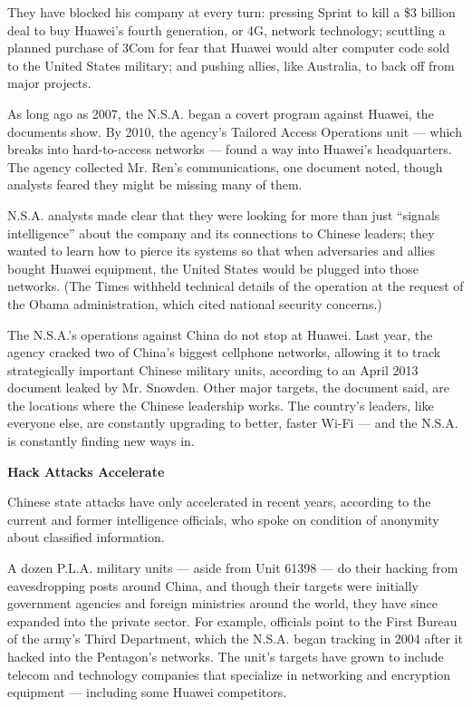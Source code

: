 They have blocked his company at every turn: pressing Sprint to kill a
\$3 billion deal to buy Huawei's fourth generation, or 4G, network
technology; scuttling a planned purchase of 3Com for fear that Huawei
would alter computer code sold to the United States military; and
pushing allies, like Australia, to back off from major projects.

As long ago as 2007, the N.S.A. began a covert program against Huawei,
the documents show. By 2010, the agency's Tailored Access Operations
unit --- which breaks into hard-to-access networks --- found a way into
Huawei's headquarters. The agency collected Mr. Ren's communications,
one document noted, though analysts feared they might be missing many of
them.

N.S.A. analysts made clear that they were looking for more than just
``signals intelligence'' about the company and its connections to
Chinese leaders; they wanted to learn how to pierce its systems so that
when adversaries and allies bought Huawei equipment, the United States
would be plugged into those networks. (The Times withheld technical
details of the operation at the request of the Obama administration,
which cited national security concerns.)

The N.S.A.'s operations against China do not stop at Huawei. Last year,
the agency cracked two of China's biggest cellphone networks, allowing
it to track strategically important Chinese military units, according to
an April 2013 document leaked by Mr. Snowden. Other major targets, the
document said, are the locations where the Chinese leadership works. The
country's leaders, like everyone else, are constantly upgrading to
better, faster Wi-Fi --- and the N.S.A. is constantly finding new ways
in.

\textbf{Hack Attacks Accelerate}

Chinese state attacks have only accelerated in recent years, according
to the current and former intelligence officials, who spoke on condition
of anonymity about classified information.

A dozen P.L.A. military units --- aside from Unit 61398 --- do their
hacking from eavesdropping posts around China, and though their targets
were initially government agencies and foreign ministries around the
world, they have since expanded into the private sector. For example,
officials point to the First Bureau of the army's Third Department,
which the N.S.A. began tracking in 2004 after it hacked into the
Pentagon's networks. The unit's targets have grown to include telecom
and technology companies that specialize in networking and encryption
equipment --- including some Huawei competitors.

